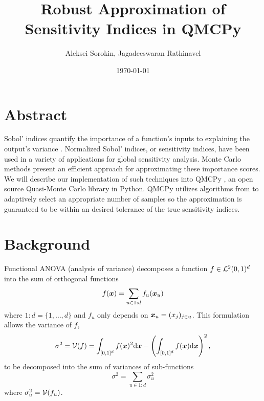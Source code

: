 \documentclass{article}
\title{Robust Approximation of Sensitivity Indices in QMCPy}
\author{Aleksei Sorokin, Jagadeeswaran Rathinavel}
\date{\today}
\begin{document}
\maketitle

\section{Abstract}

Sobol' indices quantify the importance of a function's inputs to explaining the output's variance \cite[Appendix A]{mcbook}.  Normalized Sobol' indices, or sensitivity indices, have been used in a variety of applications for global sensitivity analysis. Monte Carlo methods present an efficient approach for approximating these importance scores. We will describe our implementation of such techniques into QMCPy \cite{QMCPy}, an open source Quasi-Monte Carlo library in Python. QMCPy utilizes algorithms from \cite{reliable_sobol_indices_approx} to adaptively select an appropriate number of samples so the approximation is guaranteed to be within an desired tolerance of the true sensitivity indices. 

\section{Background}

Functional ANOVA (analysis of variance) decomposes a function $f \in \mathcal{L}^2(0,1)^d$ into the sum of orthogonal functions
\begin{equation}
    f(\boldsymbol{x}) = \sum_{u \in 1:d} f_u(\boldsymbol{x}_u)
\end{equation}
\cite[Appendix A]{mcbook} where $1:d = \{1,\dots,d\}$ and $f_u$ only depends on $\boldsymbol{x}_u = (x_j)_{j \in u}$. This formulation allows the variance of $f$,
\begin{equation}
    \sigma^2 = \mathcal{V}(f) =
    \int_{[0,1]^d} f(\boldsymbol{x})^2 \mathrm{d} \boldsymbol{x} - \left(\int_{[0,1]^d}f(\boldsymbol{x})\mathrm{d}\boldsymbol{x}\right)^2,
\end{equation} 
to be decomposed into the sum of variances of sub-functions
\begin{equation}
    \sigma^2 = \sum_{u \in 1:d} \sigma^2_u
\end{equation}
where $\sigma_u^2 = \mathcal{V}(f_u)$. 
\end{document}

